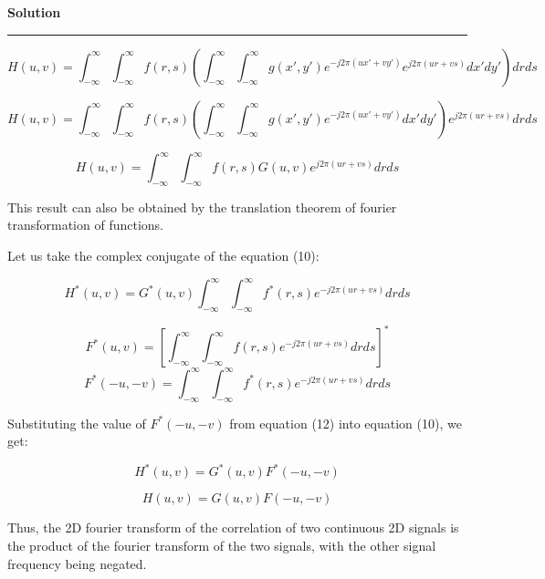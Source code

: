 \documentclass[a4paper]{article}
\newenvironment{solution}[2][]{%
    \begin{mdframed}[linecolor=green!60!black, linewidth=2pt, roundcorner=10pt, backgroundcolor=green!5!white, skipabove=12pt, skipbelow=12pt]%
        \textbf{\large #2} %
        \par\noindent\rule{\textwidth}{0.4pt} %
        \vspace{0.5em} %
}{%
    \end{mdframed}%
}
\begin{document}
\begin{solution}{Solution}
\begin{equation}
    H(u, v) = \int_{-\infty}^{\infty} \int_{-\infty}^{\infty} f(r, s) \left( \int_{-\infty}^{\infty} \int_{-\infty}^{\infty} g(x', y') e^{-j2\pi(ux'+vy')} e^{j2\pi(ur+vs)} dx' dy' \right) dr ds
\end{equation}

\begin{equation}
    H(u, v) = \int_{-\infty}^{\infty} \int_{-\infty}^{\infty} f(r, s) \left( \int_{-\infty}^{\infty} \int_{-\infty}^{\infty} g(x', y') e^{-j2\pi(ux'+vy')} dx' dy' \right) e^{j2\pi(ur+vs)} dr ds
\end{equation}

\begin{equation}
    H(u, v) = \int_{-\infty}^{\infty} \int_{-\infty}^{\infty} f(r, s) G(u,v) e^{j2\pi(ur+vs)} dr ds
\end{equation}


This result can also be obtained by the translation theorem of fourier transformation of functions. 

Let us take the complex conjugate of the equation (10):

\begin{equation}
    H^*(u, v) = G^*(u,v) \int_{-\infty}^{\infty} \int_{-\infty}^{\infty} f^*(r, s)  e^{-j2\pi(ur+vs)} dr ds
\end{equation}

\begin{equation}
    F^*(u, v) = [\int_{-\infty}^{\infty} \int_{-\infty}^{\infty} f(r, s)  e^{-j2\pi(ur+vs)} dr ds]^*
\end{equation}
\begin{equation}
    F^*(-u, -v) = \int_{-\infty}^{\infty} \int_{-\infty}^{\infty} f^*(r, s)  e^{-j2\pi(ur+vs)} dr ds
\end{equation}

Substituting the value of $F^*(-u, -v)$ from equation (12) into equation (10), we get:

\begin{equation}
    H^*(u, v) = G^*(u,v) F^*(-u, -v)
\end{equation}

\begin{equation}
    H(u, v) = G(u,v) F(-u, -v)
\end{equation}

Thus, the 2D fourier transform of the correlation of two continuous 2D signals is the product of the fourier transform of the two signals, with the other signal frequency being negated.



\end{solution}
\end{document}
